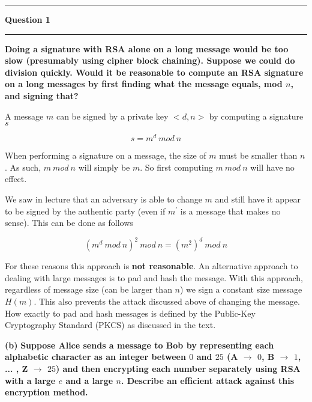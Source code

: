 \documentclass[11pt]{article}
\newcommand\question[2]{\vspace{.25in}\hrule\textbf{#1}\vspace{.5em}\hrule\vspace{.10in}}
\renewcommand\part[1]{\vspace{.10in}\textbf{(#1)}}
\begin{document}
\raggedright
\newcommand\NAME{Jake Pitkin}  %
\newcommand\UID{u0891770}     %
\newcommand\HWNUM{3}              %

\question{Question 1}

\part{a} \textbf{Doing a signature with RSA alone on a long message would be too slow (presumably using cipher block chaining). Suppose we could do division quickly. Would it be reasonable to compute an RSA signature on a long messages by first finding what the message equals, mod $n$, and signing that?}

A message $m$ can be signed by a private key ${<}d,n{>}$ by computing a signature $s$

$$s = m^d \ mod \ n$$

When performing a signature on a message, the size of $m$ must be smaller than $n$. As such, $m \ mod \ n$ will simply be $m$. So first computing $m \ mod \ n$ will have no effect.

We saw in lecture that an adversary is able to change $m$ and still have it appear to be signed by the authentic party (even if $m^\prime$ is a message that makes no sense). This can be done as follows

$$(m^d \ mod \ n)^2 \ mod \ n = (m^2)^d \ mod \ n$$

For these reasons this approach is \textbf{not reasonable}. An alternative approach to dealing with large messages is to pad and hash the message. With this approach, regardless of message size (can be larger than $n$) we sign a constant size message $H(m)$. This also prevents the attack discussed above of changing the message. How exactly to pad and hash messages is defined by the Public-Key Cryptography Standard (PKCS) as discussed in the text.



\part{b} \textbf{Suppose Alice sends a message to Bob by representing each alphabetic character as an integer between $0$ and $25$ (A $\rightarrow$ $0$, B $\rightarrow$ $1$, ... , Z $\rightarrow$ $25$) and then encrypting each number separately using RSA with a large $e$ and a large $n$. Describe an efficient attack against this encryption method.}
\end{document}
